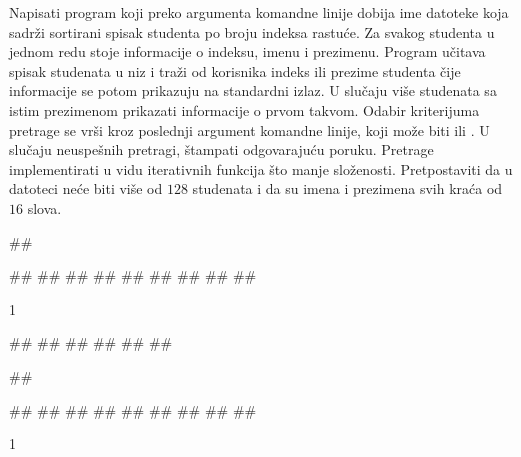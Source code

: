 \begin{Answer}[ref=3_02]
\end{Answer}
\begin{Exercise}[label=3_03]
  Napisati program koji preko argumenta komandne linije dobija ime
  datoteke koja sadrži sortirani spisak studenta po broju indeksa
  rastuće. Za svakog studenta u jednom redu stoje informacije o
  indeksu, imenu i prezimenu. Program učitava spisak studenata u niz i
  traži od korisnika indeks ili prezime studenta čije informacije se
  potom prikazuju na standardni izlaz. U slučaju više studenata sa istim
  prezimenom prikazati informacije o prvom takvom. Odabir kriterijuma
  pretrage se vrši kroz poslednji argument komandne linije, koji može
  biti  ili . U slučaju neuspešnih
  pretragi, štampati odgovarajuću poruku. Pretrage implementirati u
  vidu iterativnih funkcija što manje složenosti. Pretpostaviti da u
  datoteci neće biti više od $128$ studenata i da su imena i prezimena
  svih kraća od $16$ slova.
  
\begin{miditest}
\begin{upotreba}{1}
##
  
##
##
##
##
##
##
##
##
##
\end{upotreba}
\end{miditest}
\begin{miditest}
\begin{test2}{1}
  
  
#\naslovInt#
## 
##
##
## 
##
\end{test2}
\end{miditest}

\begin{miditest}
\begin{upotreba}{2}
##
  
##
##
##
##
##
##
##
##
##
\end{upotreba}
\end{miditest}
\begin{miditest}
\begin{test2}{1}
  

\end{test2}
\end{miditest}
\end{Exercise}
